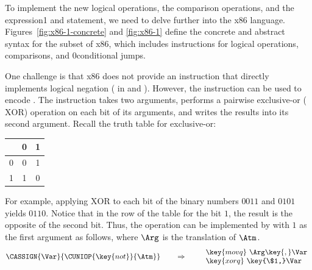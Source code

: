 \documentclass[7x10,nocrop]{TimesAPriori_MIT}%
\def\racketEd{0}
\def\pythonEd{1}
\def\edition{1}
\newcommand{\racket}[1]{{\if\edition\racketEd{#1}\fi}}
\newcommand{\python}[1]{{\if\edition\pythonEd #1\fi}}
\begin{document}
 To implement the new logical operations, the comparison
operations, and the  expression\python{ and statement}, we need to delve further into
the x86 language. Figures~\ref{fig:x86-1-concrete} and \ref{fig:x86-1}
define the concrete and abstract syntax for the \LangXIf{} subset
of x86, which includes instructions for logical operations,
comparisons, and \racket{conditional} jumps.

One challenge is that x86 does not provide an instruction that
directly implements logical negation ( in \LangIf{} and
\LangCIf{}).  However, the  instruction can be used to
encode .  The  instruction takes two arguments,
performs a pairwise exclusive-or ($\mathrm{XOR}$) operation on each
bit of its arguments, and writes the results into its second argument.
Recall the truth table for exclusive-or:
\begin{center}
\begin{tabular}{l|cc}
   & 0 & 1 \\ \hline
0  & 0 & 1 \\
1  & 1 & 0
\end{tabular}
\end{center}
For example, applying $\mathrm{XOR}$ to each bit of the binary numbers
$0011$ and $0101$ yields $0110$. Notice that in the row of the table
for the bit $1$, the result is the opposite of the second bit.  Thus,
the  operation can be implemented by  with $1$ as
the first argument as follows, where $\Arg$ is the translation of
$\Atm$.
\[
\CASSIGN{\Var}{\CUNIOP{\key{not}}{\Atm}}
\qquad\Rightarrow\qquad
\begin{array}{l}
\key{movq}~ \Arg\key{,} \Var\\
\key{xorq}~ \key{\$1,} \Var
\end{array}
\]
\end{document}
